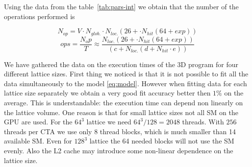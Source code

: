 \documentclass[a4paper]{llncs}
\begin{document}
Using the data from the table~\ref{tab:pars-int} we obtain that the number of
the operations performed is

\begin{equation}
N_{op} = V\cdot N_{glob.}\cdot N_{loc.}(26+\cdot N_{hit}(64+exp))
\end{equation}
\begin{equation}
  ops =   \frac{ N_op }{ T }
  \approx \frac{ N_{loc.}(26+\cdot N_{hit}(64+exp)) }
               { \left(c + N_{loc.}\left(d + N_{hit}\cdot e\right)\right) }
\end{equation}

We have gathered the data on the execution times of the 3D program for four
different lattice sizes. First thing we noticed is that it is not possible to
fit all the data simultaneously to the model \eqref{eq:model}. However when
fitting data for each lattice size separately we obtain a very good fit
accuracy better then $1\%$ on the average. This is understandable: the
execution time can depend non linearly on the lattice volume. One reason is
that for small lattice sizes not all SM on the GPU are used. For the $64^3$
lattice we need $64^3/128=2048$ threads. With $256$ threads per CTA we use only
$8$ thread blocks, which is much smaller than 14 available SM. Even for $128^3$
lattice the 64 needed blocks will not use the SM evenly. Also the L2 cache may
introduce some non-linear dependence on the lattice size.
\end{document}
